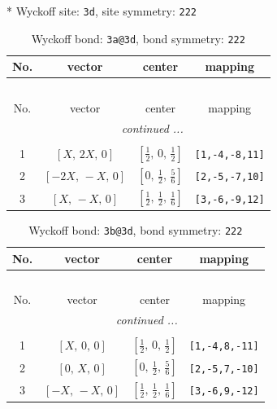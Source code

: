 \documentclass[fleqn,8pt]{jsarticle}
\begin{document}
* Wyckoff site: {\tt 3d}, site symmetry: {\tt 222}
\renewcommand{\arraystretch}{1.2}
\begin{longtable}{cccc}
\caption{Wyckoff bond: {\tt 3a@3d}, bond symmetry: {\tt 222}}
 \\
 \hline \hline
No. & vector & center & mapping \\ \hline \endfirsthead

\multicolumn{3}{l}{\tablename\ \thetable{}} \\
 \hline \hline
No. & vector & center & mapping \\ \hline \endhead

 \hline \hline
\multicolumn{3}{r}{\footnotesize\it continued ...} \\ \endfoot

 \hline \hline
\multicolumn{3}{r}{} \\ \endlastfoot

1 & $\left[ X,\, 2 X,\, 0 \right]$ & $\left[ \frac{1}{2},\, 0,\, \frac{1}{2} \right]$ & {\tt [1,-4,-8,11]} \\ \hline
2 & $\left[ - 2 X,\, - X,\, 0 \right]$ & $\left[ 0,\, \frac{1}{2},\, \frac{5}{6} \right]$ & {\tt [2,-5,-7,10]} \\ \hline
3 & $\left[ X,\, - X,\, 0 \right]$ & $\left[ \frac{1}{2},\, \frac{1}{2},\, \frac{1}{6} \right]$ & {\tt [3,-6,-9,12]} \\
\end{longtable}
\renewcommand{\arraystretch}{1.2}
\begin{longtable}{cccc}
\caption{Wyckoff bond: {\tt 3b@3d}, bond symmetry: {\tt 222}}
 \\
 \hline \hline
No. & vector & center & mapping \\ \hline \endfirsthead

\multicolumn{3}{l}{\tablename\ \thetable{}} \\
 \hline \hline
No. & vector & center & mapping \\ \hline \endhead

 \hline \hline
\multicolumn{3}{r}{\footnotesize\it continued ...} \\ \endfoot

 \hline \hline
\multicolumn{3}{r}{} \\ \endlastfoot

1 & $\left[ X,\, 0,\, 0 \right]$ & $\left[ \frac{1}{2},\, 0,\, \frac{1}{2} \right]$ & {\tt [1,-4,8,-11]} \\ \hline
2 & $\left[ 0,\, X,\, 0 \right]$ & $\left[ 0,\, \frac{1}{2},\, \frac{5}{6} \right]$ & {\tt [2,-5,7,-10]} \\ \hline
3 & $\left[ - X,\, - X,\, 0 \right]$ & $\left[ \frac{1}{2},\, \frac{1}{2},\, \frac{1}{6} \right]$ & {\tt [3,-6,9,-12]} \\
\end{longtable}
\end{document}
